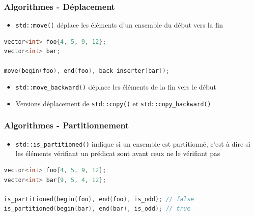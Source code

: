 \documentclass[C++.tex]{subfiles}
\begin{document}
\begin{frame}[fragile]
	\frametitle{Algorithmes - Déplacement}
	\begin{itemize}
		\item \lstinline|std::move()| déplace les éléments d'un ensemble du début vers la fin
	\end{itemize}

	\begin{lstlisting}[language=C++]
vector<int> foo{4, 5, 9, 12};
vector<int> bar;

move(begin(foo), end(foo), back_inserter(bar));\end{lstlisting}

	\begin{itemize}
		\item \lstinline|std::move_backward()| déplace les éléments de la fin vers le début
		\item Versions \og déplacement\fg{} de \lstinline|std::copy()| et \lstinline|std::copy_backward()|
	\end{itemize}
\end{frame}

\begin{frame}[fragile]
	\frametitle{Algorithmes - Partitionnement}
	\begin{itemize}
		\item \lstinline|std::is_partitioned()| indique si un ensemble est partitionné, c'est à dire si les éléments vérifiant un prédicat sont avant ceux ne le vérifiant pas
	\end{itemize}

	\begin{lstlisting}[language=C++]
vector<int> foo{4, 5, 9, 12};
vector<int> bar{9, 5, 4, 12};

is_partitioned(begin(foo), end(foo), is_odd); // false
is_partitioned(begin(bar), end(bar), is_odd); // true\end{lstlisting}
\end{frame}
\end{document}
